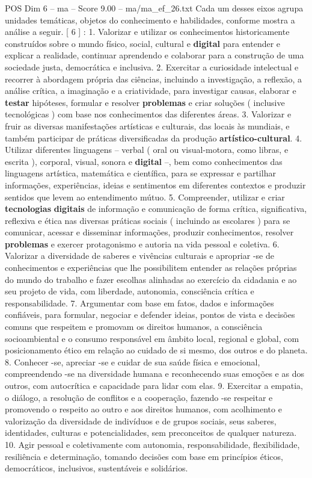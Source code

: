 \begin{textsample}{POS Dim 6 – ma – Score 9.00 – ma/ma\_ef\_26.txt}
Cada um desses eixos agrupa unidades temáticas, objetos do conhecimento e habilidades, conforme mostra a análise a seguir. [ 6 ] : 1.
Valorizar e utilizar os conhecimentos historicamente construídos sobre o mundo físico, social, cultural e \textbf{digital} para entender e explicar a realidade, continuar aprendendo e colaborar para a construção de uma sociedade justa, democrática e inclusiva. 2.
Exercitar a curiosidade intelectual e recorrer à abordagem própria das ciências, incluindo a investigação, a reflexão, a análise crítica, a imaginação e a criatividade, para investigar causas, elaborar e \textbf{testar} hipóteses, formular e resolver \textbf{problemas} e criar soluções ( inclusive tecnológicas ) com base nos conhecimentos das diferentes áreas. 3.
Valorizar e fruir as diversas manifestações artísticas e culturais, das locais às mundiais, e também participar de práticas diversificadas da produção \textbf{artístico-cultural}. 4.
Utilizar diferentes linguagens – verbal ( oral ou visual-motora, como libras, e escrita ), corporal, visual, sonora e \textbf{digital} –, bem como conhecimentos das linguagens artística, matemática e científica, para se expressar e partilhar informações, experiências, ideias e sentimentos em diferentes contextos e produzir sentidos que levem ao entendimento mútuo. 5.
Compreender, utilizar e criar \textbf{tecnologias} \textbf{digitais} de informação e comunicação de forma crítica, significativa, reflexiva e ética nas diversas práticas sociais ( incluindo as escolares ) para se comunicar, acessar e disseminar informações, produzir conhecimentos, resolver \textbf{problemas} e exercer protagonismo e autoria na vida pessoal e coletiva. 6.
Valorizar a diversidade de saberes e vivências culturais e apropriar -se de conhecimentos e experiências que lhe possibilitem entender as relações próprias do mundo do trabalho e fazer escolhas alinhadas ao exercício da cidadania e ao seu projeto de vida, com liberdade, autonomia, consciência crítica e responsabilidade. 7.
Argumentar com base em fatos, dados e informações confiáveis, para formular, negociar e defender ideias, pontos de vista e decisões comuns que respeitem e promovam os direitos humanos, a consciência socioambiental e o consumo responsável em âmbito local, regional e global, com posicionamento ético em relação ao cuidado de si mesmo, dos outros e do planeta. 8.
Conhecer -se, apreciar -se e cuidar de sua saúde física e emocional, compreendendo -se na diversidade humana e reconhecendo suas emoções e as dos outros, com autocrítica e capacidade para lidar com elas. 9.
Exercitar a empatia, o diálogo, a resolução de conflitos e a cooperação, fazendo -se respeitar e promovendo o respeito ao outro e aos direitos humanos, com acolhimento e valorização da diversidade de indivíduos e de grupos sociais, seus saberes, identidades, culturas e potencialidades, sem preconceitos de qualquer natureza. 10.
Agir pessoal e coletivamente com autonomia, responsabilidade, flexibilidade, resiliência e determinação, tomando decisões com base em princípios éticos, democráticos, inclusivos, sustentáveis e solidários.

\end{textsample}
